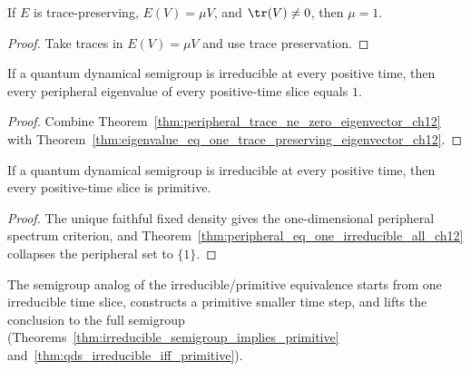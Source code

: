 \begin{theorem}
    \label{thm:eigenvalue_eq_one_trace_preserving_eigenvector_ch12}
    \leanok
    If $E$ is trace-preserving, $E(V)=\mu V$, and $\tr(V) \ne 0$, then $\mu = 1$.
\end{theorem}

\begin{proof}
    \leanok
    Take traces in $E(V)=\mu V$ and use trace preservation.
\end{proof}

\begin{theorem}
    \label{thm:peripheral_eq_one_irreducible_all_ch12}
    \leanok
    If a quantum dynamical semigroup is irreducible at every positive time, then every
    peripheral eigenvalue of every positive-time slice equals $1$.
\end{theorem}

\begin{proof}
    \leanok
    Combine Theorem~\ref{thm:peripheral_trace_ne_zero_eigenvector_ch12} with
    Theorem~\ref{thm:eigenvalue_eq_one_trace_preserving_eigenvector_ch12}.
\end{proof}

\begin{theorem}
    \label{thm:primitive_of_irreducible_all_ch12}
    \leanok
    If a quantum dynamical semigroup is irreducible at every positive time, then every
    positive-time slice is primitive.
\end{theorem}

\begin{proof}
    \leanok
    The unique faithful fixed density gives the one-dimensional peripheral spectrum criterion,
    and Theorem~\ref{thm:peripheral_eq_one_irreducible_all_ch12} collapses the peripheral set
    to $\{1\}$.
\end{proof}

\begin{remark}\leanok
    The semigroup analog of the irreducible/primitive equivalence
    starts from one irreducible time slice, constructs a primitive
    smaller time step, and lifts the conclusion to the full semigroup
    (Theorems~\ref{thm:irreducible_semigroup_implies_primitive}
    and~\ref{thm:qds_irreducible_iff_primitive}).
\end{remark}

